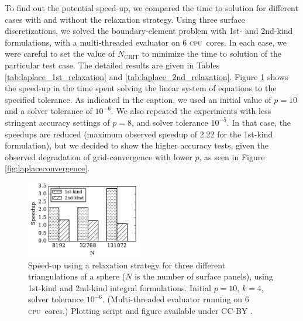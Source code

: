 \documentclass[final,3p,times]{elsarticle}
\newcommand{\cpu}{\textsc{cpu}}
\newcommand{\ncrit}{N_{\text{CRIT}}}
\begin{document}
To find out the potential speed-up, we compared the time to solution for different cases with and without the relaxation strategy. Using three surface discretizations, we solved the boundary-element problem with 1st- and 2nd-kind formulations, with a multi-threaded evaluator on 6 \cpu\ cores. In each case, we were careful to set the value of $\ncrit$ to minimize the time to solution of the particular test case. 
The detailed results are given in Tables \ref{tab:laplace_1st_relaxation} and \ref{tab:laplace_2nd_relaxation}.
Figure \ref{fig:relaxation_timing} shows the speed-up in the time spent solving the linear system of equations to the specified tolerance. 
As indicated in the caption, we used an initial value of $p=10$ and a solver tolerance of $10^{-6}$.
We also repeated the experiments with less stringent accuracy settings of $p=8$, and solver tolerance $10^{-5}$. In that case, the speedups are reduced (maximum observed speedup of 2.22 for the 1st-kind formulation), but we decided to show the higher accuracy tests, given the observed degradation of grid-convergence with lower $p$, as seen in Figure \ref{fig:laplaceconvergence}.


\begin{figure}%
	\centering
	\includegraphics[natwidth=3in,natheight=2in,width=0.45\textwidth]{LaplaceSpeedupRelaxation.pdf}
	\caption{Speed-up using a relaxation strategy for three different triangulations of a sphere ($N$ is the number of surface panels), using 1st-kind and 2nd-kind integral formulations. Initial $p=10$, $k=4$, solver tolerance $10^{-6}$. (Multi-threaded evaluator running on 6 \cpu\ cores.) Plotting script and figure available under CC-BY \cite{WangLaytonBarba2016-figshare2}.}
	\label{fig:relaxation_timing}
\end{figure}
\end{document}

